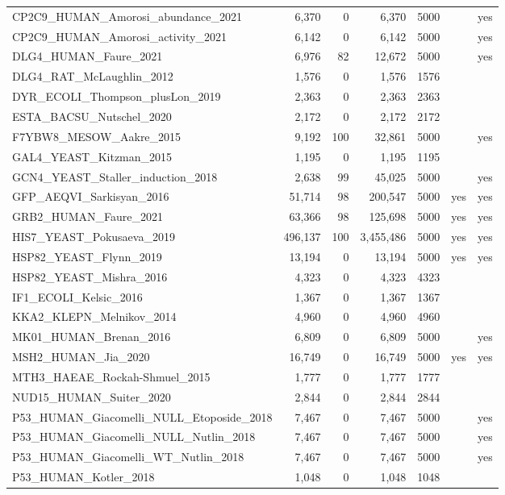 \documentclass[11pt,a4paper]{article}
\begin{document}
\begin{table}[H]
\begin{tabular}{lrrrrrr}
CP2C9\_HUMAN\_Amorosi\_abundance\_2021 & 6,370 & 0 & 6,370 & 5000 &  & yes \\
CP2C9\_HUMAN\_Amorosi\_activity\_2021 & 6,142 & 0 & 6,142 & 5000 &  & yes \\
DLG4\_HUMAN\_Faure\_2021 & 6,976 & 82 & 12,672 & 5000 &  & yes \\
DLG4\_RAT\_McLaughlin\_2012 & 1,576 & 0 & 1,576 & 1576 &  &  \\
DYR\_ECOLI\_Thompson\_plusLon\_2019 & 2,363 & 0 & 2,363 & 2363 &  &  \\
ESTA\_BACSU\_Nutschel\_2020 & 2,172 & 0 & 2,172 & 2172 &  &  \\
F7YBW8\_MESOW\_Aakre\_2015 & 9,192 & 100 & 32,861 & 5000 &  & yes \\
GAL4\_YEAST\_Kitzman\_2015 & 1,195 & 0 & 1,195 & 1195 &  &  \\
GCN4\_YEAST\_Staller\_induction\_2018 & 2,638 & 99 & 45,025 & 5000 &  & yes \\
GFP\_AEQVI\_Sarkisyan\_2016 & 51,714 & 98 & 200,547 & 5000 & yes & yes \\
GRB2\_HUMAN\_Faure\_2021 & 63,366 & 98 & 125,698 & 5000 & yes & yes \\
HIS7\_YEAST\_Pokusaeva\_2019 & 496,137 & 100 & 3,455,486 & 5000 & yes & yes \\
HSP82\_YEAST\_Flynn\_2019 & 13,194 & 0 & 13,194 & 5000 & yes & yes \\
HSP82\_YEAST\_Mishra\_2016 & 4,323 & 0 & 4,323 & 4323 &  &  \\
IF1\_ECOLI\_Kelsic\_2016 & 1,367 & 0 & 1,367 & 1367 &  &  \\
KKA2\_KLEPN\_Melnikov\_2014 & 4,960 & 0 & 4,960 & 4960 &  &  \\
MK01\_HUMAN\_Brenan\_2016 & 6,809 & 0 & 6,809 & 5000 &  & yes \\
MSH2\_HUMAN\_Jia\_2020 & 16,749 & 0 & 16,749 & 5000 & yes & yes \\
MTH3\_HAEAE\_Rockah-Shmuel\_2015 & 1,777 & 0 & 1,777 & 1777 &  &  \\
NUD15\_HUMAN\_Suiter\_2020 & 2,844 & 0 & 2,844 & 2844 &  &  \\
P53\_HUMAN\_Giacomelli\_NULL\_Etoposide\_2018 & 7,467 & 0 & 7,467 & 5000 &  & yes \\
P53\_HUMAN\_Giacomelli\_NULL\_Nutlin\_2018 & 7,467 & 0 & 7,467 & 5000 &  & yes \\
P53\_HUMAN\_Giacomelli\_WT\_Nutlin\_2018 & 7,467 & 0 & 7,467 & 5000 &  & yes \\
P53\_HUMAN\_Kotler\_2018 & 1,048 & 0 & 1,048 & 1048 &  &  \\

\end{tabular}
\end{table}
\end{document}
